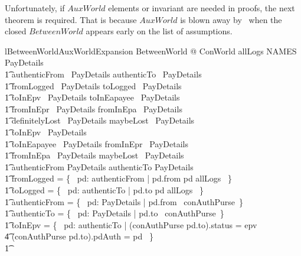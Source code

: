 Unfortunately, if $AuxWorld$ elements or invariant are needed in proofs, the
next theorem is required. That is because $AuxWorld$ is blown away by \zeves\
when the closed $BetweenWorld$ appears early on the list of assumptions.
%
\begin{LNewLemma}
\begin{theorem}{lBetweenWorldAuxWorldExpansion}
    \forall BetweenWorld @ ConWorld \land
            allLogs \in NAMES \rel PayDetails \land \\ \t1
            authenticFrom \in \power~PayDetails \land
            authenticTo \in \power~PayDetails \land \\ \t1
            fromLogged \in \power~PayDetails \land
            toLogged \in \power~PayDetails \land \\ \t1
            toInEpv \in \power~PayDetails \land
            toInEapayee \in \power~PayDetails \land \\ \t1
            fromInEpr \in \power~PayDetails \land
            fromInEpa \in \power~PayDetails \land \\ \t1
            definitelyLost \in \power~PayDetails \land
            maybeLost \in \power~PayDetails \land \\
         \t1
            toInEpv \in \finset~PayDetails \land \\ \t1
            toInEapayee \in \finset~PayDetails \land
            fromInEpr \in \finset~PayDetails \land \\ \t1
            fromInEpa \in \finset~PayDetails \land
            maybeLost \in \finset~PayDetails \land \\ \t1
            authenticFrom \in \finset PayDetails \land
            authenticTo \in \finset PayDetails \land \\ \t1
            fromLogged = \{~ pd: authenticFrom | pd.from \mapsto pd \in allLogs ~\} \land \\ \t1
            toLogged = \{~ pd: authenticTo | pd.to \mapsto pd \in allLogs ~\} \land \\ \t1
            authenticFrom = \{~ pd: PayDetails | pd.from \in \dom~conAuthPurse~\} \land \\ \t1
            authenticTo = \{~ pd: PayDetails | pd.to \in \dom~conAuthPurse~\} \land \\ \t1
            toInEpv = \{~ pd: authenticTo | (conAuthPurse pd.to).status = epv \\
                    \t4 \land (conAuthPurse pd.to).pdAuth = pd ~\} \land \\ \t1

\end{theorem}
\end{LNewLemma}
